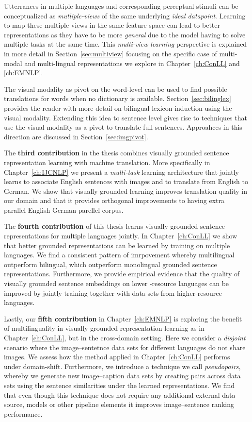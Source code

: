 Utterrances in multiple languages and corresponding perceptual stimuli
can be conceptualized as \emph{mutliple-views} of the same underlying \emph{ideal datapoint}.
Learning to map these multiple views in the same feature-space can lead to better representations as
they have to be more \emph{general} due to the model having to solve multiple tasks at the same time. 
This \emph{multi-view learning} perspective is explained in more detail in Section~\ref{sec:multiview} 
focusing on the specific case of multi-modal and multi-lingual representations we explore in 
Chapter~\ref{ch:ConLL} and \ref{ch:EMNLP}.

The visual modality as pivot on the word-level can be used to find possible translations 
for words when no dictionary is available. Section~\ref{sec:bilinglex} provides the reader with more
detail on bilingual lexicon induction using the visual modality. 
Extending this idea to sentence level gives rise to techniques that
use the visual modality as a pivot to translate full sentences. Approahces in this direction are discussed
in Section~\ref{sec:imgpivot}. 

The \textbf{third contribution} in the thesis combines visually grounded sentence representation learning
with machine translation. More specifically in Chapter~\ref{ch:IJCNLP} we present a \emph{multi-task} 
learning architecture that jointly learns to associate English sentences with images and to translate from
English to German. We show that visually grounded learning improves translation quality in our domain and that 
it provides orthogonal improvements to having extra parallel English-German parellel corpus.

The \textbf{fourth contribution} of this thesis learns visually grounded sentence representations for 
multiple languages jointly.  In Chapter~\ref{ch:ConLL} we show that better grounded 
representations can be learned by training on multiple languages. We find a consistent pattern
of imrpovement whereby multilingual outperform bilingual, which outperform monolingual grounded
sentence representations. Furthermore, we provide empirical evidence that the quality of 
visually grounded sentence embeddings on lower -resource languages can be improved by jointly training
together with data sets from higher-resource languages.

Lastly, our \textbf{fifth contribution} in Chapter~\ref{ch:EMNLP} is exploring the benefit of multilinguality
in visually grounded representation learning as in Chapter~\ref{ch:ConLL}, but in the cross-domain setting.
Here we consider a \emph{disjoint} scenario where the image--sentetnce data sets for different languages do
not share images. We assess how the method applied in Chapter~\ref{ch:ConLL} performs under 
domain-shift. Furthermore, we introduce a technique we call \emph{pseudopairs}, whereby we generate
new image--caption data sets by creating pairs across data sets using the sentence similarities under
the learned representations. We find that even though this technique does not require any additional 
external data source, models or other pipeline elements it improves image--sentence ranking performance.


